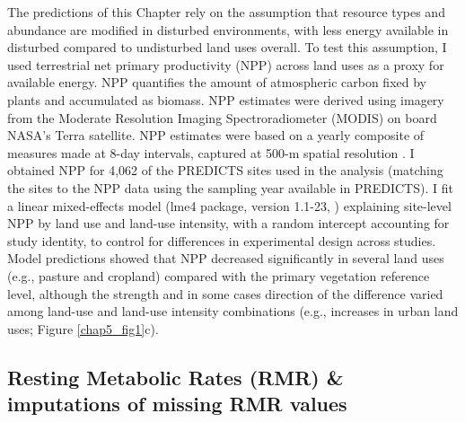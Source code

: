 The predictions of this Chapter rely on the assumption that resource types and abundance are modified in disturbed environments, with less energy available in disturbed compared to undisturbed land uses overall. To test this assumption, I used terrestrial net primary productivity (NPP) across land uses as a proxy for available energy. NPP quantifies the amount of atmospheric carbon fixed by plants and accumulated as biomass. NPP estimates were derived using imagery from the Moderate Resolution Imaging Spectroradiometer (MODIS) on board NASA’s Terra satellite. NPP estimates were based on a yearly composite of measures made at 8-day intervals, captured at 500-m spatial resolution \citep{Running2015}. I obtained NPP for 4,062 of the PREDICTS sites used in the analysis (matching the sites to the NPP data using the sampling year available in PREDICTS). I fit a linear mixed-effects model (lme4 package, version 1.1-23, \citet{Bates2015}) explaining site-level NPP by land use and land-use intensity, with a random intercept accounting for study identity, to control for differences in experimental design across studies. Model predictions showed that NPP decreased significantly in several land uses (e.g., pasture and cropland) compared with the primary vegetation reference level, although the strength and in some cases direction of the difference varied among land-use and land-use intensity combinations (e.g., increases in urban land uses; Figure \ref{chap5_fig1}c).

\subsection{Resting Metabolic Rates (RMR) \& imputations of missing RMR values}

